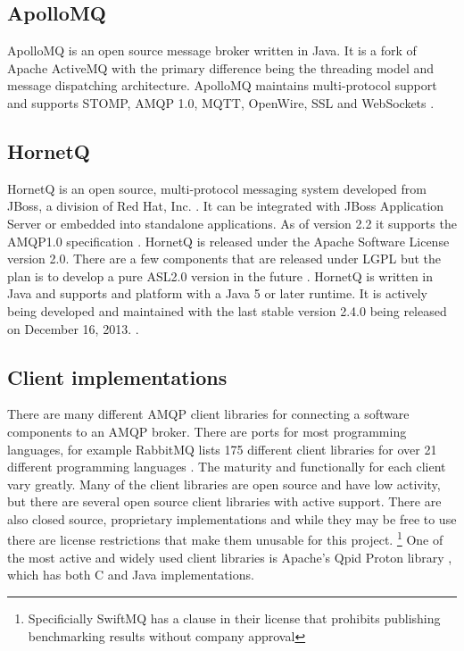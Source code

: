 \documentclass{thesis}
\begin{document}
\subsection{ApolloMQ}
ApolloMQ is an open source message broker written in Java.  It is a fork of Apache ActiveMQ with the primary difference being the threading model and message dispatching architecture.  ApolloMQ maintains multi-protocol support and supports STOMP, AMQP 1.0, MQTT, OpenWire, SSL and WebSockets \cite{APOLLO}.

\subsection{HornetQ}
HornetQ is an open source, multi-protocol messaging system developed from JBoss, a division of Red Hat, Inc. \cite{REDHAT}.  It can be integrated with JBoss Application Server or embedded into standalone applications.  As of version 2.2 it supports the AMQP1.0 specification \cite{HORNETQ_ROADMAP}.  HornetQ is released under the Apache Software License version 2.0.  There are a few components that are released under LGPL but the plan is to develop a pure ASL2.0 version in the future .  HornetQ is written in Java and supports and platform with a Java 5 or later runtime.   It is actively being developed and maintained with the last stable version 2.4.0 being released on December 16, 2013. \cite{HORNETQ}.  

\subsection{Client implementations}
There are many different AMQP client libraries for connecting a software components to an AMQP broker.  There are ports for most programming languages, for example RabbitMQ lists 175 different client libraries for over 21 different programming languages \cite{RABBITMQ_CLIENTS}.  The maturity and functionally for each client vary greatly.  Many of the client libraries are open source and have low activity, but there are several open source client libraries with active support.  There are also closed source, proprietary implementations and while they may be free to use there are license restrictions that make them unusable for this project. \footnote{Specificially SwiftMQ has a clause in their license that prohibits publishing benchmarking results without company approval} One of the most active and widely used client libraries is Apache's Qpid Proton library \cite{QPID_PROTON}, which has both C and Java implementations.  
\end{document}
